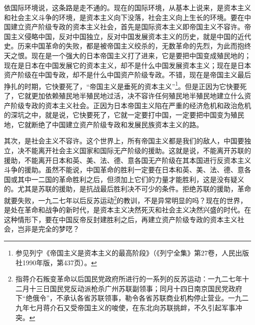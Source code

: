 \documentclass[UTF8, 12pt, a4paper]{ctexrep}
\begin{document}
依国际环境说，这条路是走不通的。现在的国际环境，从基本上说来，是资本主义和社会主义斗争的环境，是资本主义向下没落，社会主义向上生长的环境。要在中国建立资产阶级专政的资本主义社会，首先是国际资本主义即帝国主义不容许。帝国主义侵略中国，反对中国独立，反对中国发展资本主义的历史，就是中国的近代史。历来中国革命的失败，都是被帝国主义绞杀的，无数革命的先烈，为此而抱终天之恨。现在是一个强大的日本帝国主义打了进来，它是要把中国变成殖民地的；现在是日本在中国发展它的资本主义，却不是什么中国发展资本主义；现在是日本资产阶级在中国专政，却不是什么中国资产阶级专政。不错，现在是帝国主义最后挣扎的时期，它快要死了，“帝国主义是垂死的资本主义”\footnote{参见列宁《帝国主义是资本主义的最高阶段》（《列宁全集》第27卷，人民出版社1990年版，第437页）。}。但是正因为它快要死了，它就更加依赖殖民地半殖民地过活，决不容许任何殖民地半殖民地建立什么资产阶级专政的资本主义社会。正因为日本帝国主义陷在严重的经济危机和政治危机的深坑之中，就是说，它快要死了，它就一定要打中国，一定要把中国变为殖民地，它就断绝了中国建立资产阶级专政和发展民族资本主义的路。

其次，是社会主义不容许。这个世界上，所有帝国主义都是我们的敌人，中国要独立，决不能离开社会主义国家和国际无产阶级的援助。这就是说，不能离开苏联的援助，不能离开日本和英、美、法、德、意各国无产阶级在其本国进行反资本主义斗争的援助。虽然不能说，中国革命的胜利一定要在日本和英、美、法、德、意各国或其中一二国的革命胜利之后，但须加上它们的力量才能胜利，这是没有疑义的。尤其是苏联的援助，是抗战最后胜利决不可少的条件。拒绝苏联的援助，革命就要失败，一九二七年以后反苏运动\footnote{指蒋介石叛变革命以后国民党政府所进行的一系列的反苏运动：一九二七年十二月十三日国民党反动派枪杀广州苏联副领事；同月十四日南京国民党政府下“绝俄令”，不承认各省苏联领事，勒令各省苏联商业机构停止营业。一九二九年七月蒋介石又受帝国主义的唆使，在东北向苏联挑衅，不久引起军事冲突。}的教训，不是异常明显的吗？现在的世界，是处在革命和战争的新时代，是资本主义决然死灭和社会主义决然兴盛的时代。在这种情形下，要在中国反帝反封建胜利之后，再建立资产阶级专政的资本主义社会，岂非是完全的梦呓？
\end{document}
